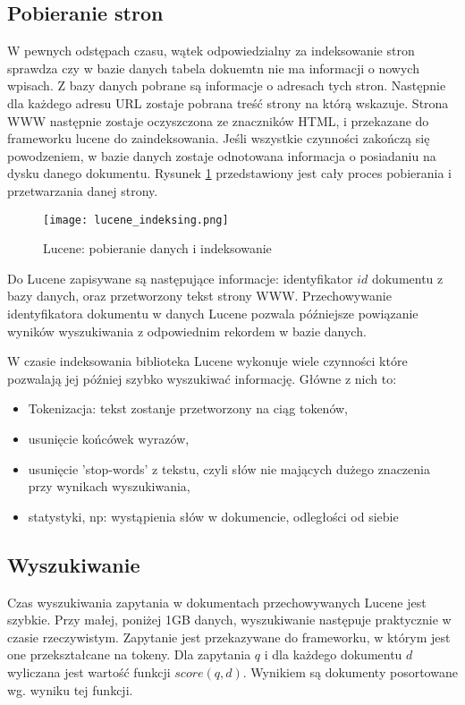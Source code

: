 \subsection{Pobieranie stron}

W pewnych odstępach czasu, wątek odpowiedzialny za indeksowanie stron sprawdza czy w bazie danych tabela dokuemtn nie ma informacji o nowych wpisach. Z bazy danych pobrane są informacje o adresach tych stron. Następnie dla każdego adresu URL zostaje pobrana treść strony na którą wskazuje. Strona WWW następnie zostaje oczyszczona ze znaczników HTML, i przekazane do frameworku lucene do zaindeksowania. Jeśli wszystkie czynności zakończą się powodzeniem, w bazie danych zostaje odnotowana informacja o posiadaniu na dysku danego dokumentu. Rysunek \ref{fig:lucene_index_fig} przedstawiony jest cały proces pobierania i przetwarzania danej strony.

\begin{figure}[htb]

\texttt{[image: lucene\_indeksing.png]}
\caption{Lucene: pobieranie danych i indeksowanie}
\label{fig:lucene_index_fig}
\end{figure}

Do Lucene zapisywane są następujące informacje: identyfikator $id$ dokumentu z bazy danych, oraz przetworzony tekst strony WWW. Przechowywanie identyfikatora dokumentu w danych Lucene pozwala późniejsze powiązanie wyników wyszukiwania z odpowiednim rekordem w bazie danych. 

W czasie indeksowania biblioteka Lucene wykonuje wiele czynności które pozwalają jej później szybko wyszukiwać informację. Główne z nich to:
\begin{itemize}
\item Tokenizacja: tekst zostanje przetworzony na ciąg tokenów,
\item usunięcie końcówek wyrazów,
\item usunięcie 'stop-words' z tekstu, czyli słów nie mających dużego znaczenia przy wynikach wyszukiwania,
\item statystyki, np: wystąpienia słów w dokumencie, odległości od siebie
\end{itemize}

\subsection{Wyszukiwanie}

Czas wyszukiwania zapytania w dokumentach przechowywanych Lucene jest szybkie. Przy małej, poniżej 1GB danych, wyszukiwanie następuje praktycznie w czasie rzeczywistym. Zapytanie jest przekazywane do frameworku, w którym jest one przekształcane na tokeny. Dla zapytania $q$ i dla każdego dokumentu $d$ wyliczana jest wartość funkcji $score(q,d)$. Wynikiem są dokumenty posortowane wg. wyniku tej funkcji.

